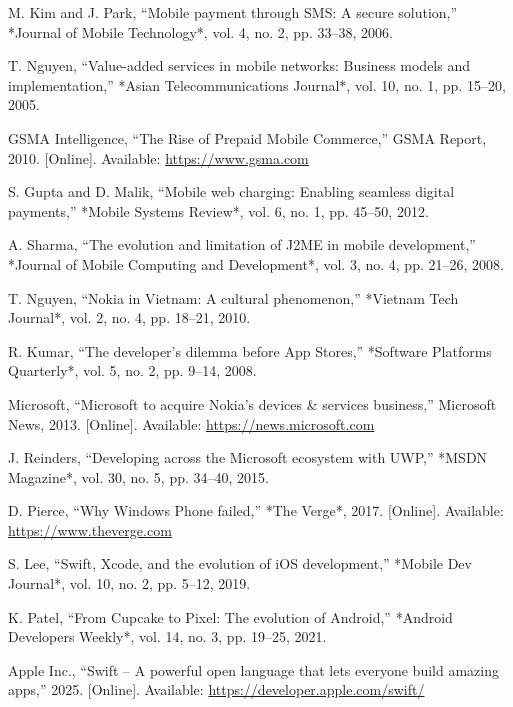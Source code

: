 \documentclass[12pt]{report}
\begin{document}
\begin{thebibliography}{1}
  M. Kim and J. Park, ``Mobile payment through SMS: A secure solution,'' *Journal of Mobile Technology*, vol. 4, no. 2, pp. 33–38, 2006.

  T. Nguyen, ``Value-added services in mobile networks: Business models and implementation,'' *Asian Telecommunications Journal*, vol. 10, no. 1, pp. 15–20, 2005.

  GSMA Intelligence, ``The Rise of Prepaid Mobile Commerce,'' GSMA Report, 2010. [Online]. Available: \url{https://www.gsma.com}

  S. Gupta and D. Malik, ``Mobile web charging: Enabling seamless digital payments,'' *Mobile Systems Review*, vol. 6, no. 1, pp. 45–50, 2012.

  A. Sharma, ``The evolution and limitation of J2ME in mobile development,'' *Journal of Mobile Computing and Development*, vol. 3, no. 4, pp. 21–26, 2008.


  T. Nguyen, ``Nokia in Vietnam: A cultural phenomenon,'' *Vietnam Tech Journal*, vol. 2, no. 4, pp. 18–21, 2010.

  R. Kumar, ``The developer’s dilemma before App Stores,'' *Software Platforms Quarterly*, vol. 5, no. 2, pp. 9–14, 2008.

  Microsoft, ``Microsoft to acquire Nokia’s devices \& services business,'' Microsoft News, 2013. [Online]. Available: \url{https://news.microsoft.com}

  J. Reinders, ``Developing across the Microsoft ecosystem with UWP,'' *MSDN Magazine*, vol. 30, no. 5, pp. 34–40, 2015.

  D. Pierce, ``Why Windows Phone failed,'' *The Verge*, 2017. [Online]. Available: \url{https://www.theverge.com}

  S. Lee, ``Swift, Xcode, and the evolution of iOS development,'' *Mobile Dev Journal*, vol. 10, no. 2, pp. 5–12, 2019.

  K. Patel, ``From Cupcake to Pixel: The evolution of Android,'' *Android Developers Weekly*, vol. 14, no. 3, pp. 19–25, 2021.


  Apple Inc., ``Swift – A powerful open language that lets everyone build amazing apps,'' 2025. [Online]. Available: \url{https://developer.apple.com/swift/}


\end{thebibliography}
\end{document}
